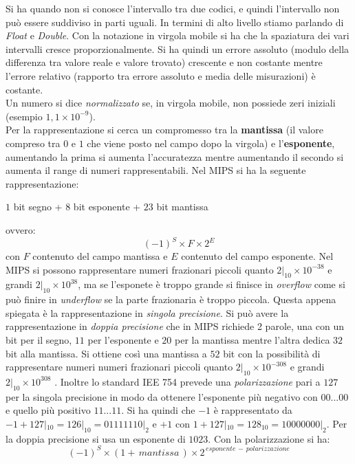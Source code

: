 \documentclass[a4paper,12pt, oneside]{book}
\begin{document}
\begin{enumerate}
Si ha quando non si conosce l'intervallo tra due codici, e quindi l'intervallo non può essere suddiviso in parti uguali. In termini di alto livello stiamo parlando di \textit{Float} e \textit{Double}. Con la notazione in virgola mobile si ha che la spaziatura dei vari intervalli cresce proporzionalmente. Si ha quindi un errore assoluto (modulo della differenza tra valore reale e valore trovato) crescente e non costante mentre l'errore relativo (rapporto tra errore assoluto e media delle misurazioni) è costante.\\
Un numero si dice \textit{normalizzato} se, in virgola mobile, non possiede zeri iniziali (esempio $1,1\times 10^{-9}$).\\
Per la rappresentazione si cerca un compromesso tra la \textbf{mantissa} (il valore compreso tra $0$ e $1$ che viene posto nel campo dopo la virgola) e l'\textbf{esponente}, aumentando la prima si aumenta l'accuratezza mentre aumentando il secondo si aumenta il range di numeri rappresentabili. Nel MIPS si ha la seguente rappresentazione:\\
\begin{center}
$1$ bit segno + $8$ bit esponente + $23$ bit mantissa 
\end{center}
ovvero: 
$$(-1)^S\times F\times 2^E$$
con $F$ contenuto del campo mantissa e $E$ contenuto del campo esponente. Nel MIPS si possono rappresentare numeri frazionari piccoli quanto $2|_{10}\times 10^{-38}$ e grandi $2|_{10}\times 10^{38}$, ma se l'esponete è troppo grande si finisce in \textit{overflow} come si può finire in \textit{underflow} se la parte frazionaria è troppo piccola. Questa appena spiegata è la rappresentazione in \textit{singola precisione}. Si può avere la rappresentazione in \textit{doppia precisione} che in MIPS richiede 2 parole, una con un bit per il segno, $11$ per l'esponente e $20$ per la mantissa mentre l'altra dedica $32$ bit alla mantissa. Si ottiene così una mantissa a $52$ bit con la possibilità di rappresentare numeri numeri frazionari piccoli quanto $2|_{10}\times 10^{-308}$ e grandi $2|_{10}\times 10^{308}$ .  Inoltre lo standard IEE 754 prevede una \textit{polarizzazione} pari a $127$ per la singola precisione in modo da ottenere l'esponente più negativo con $00...00$ e quello più positivo $11...11$. Si ha quindi che $-1$  è rappresentato da $-1+127|_{10}=126|_{10}=01111110|_2$ e $+1$ con $1+127|_{10}=128_{10}=10000000|_2$. Per la doppia precisione si usa un esponente di $1023$. Con la polarizzazione si ha:
$$(-1)^S\times(1+\, mantissa\,)\times 2^{\,esponente\,-\,polarizzazione} $$

\end{enumerate}
\end{document}
